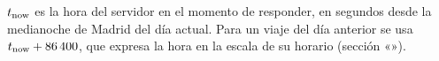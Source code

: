 \begin{definicion}
$t_{\mathrm{now}}$ es la hora del servidor en el momento de responder, en segundos desde la medianoche de Madrid del día actual.
Para un viaje del día anterior se usa $t_{\mathrm{now}}+86\,400$, que expresa la hora en la escala de su horario (sección «»).
\end{definicion}
